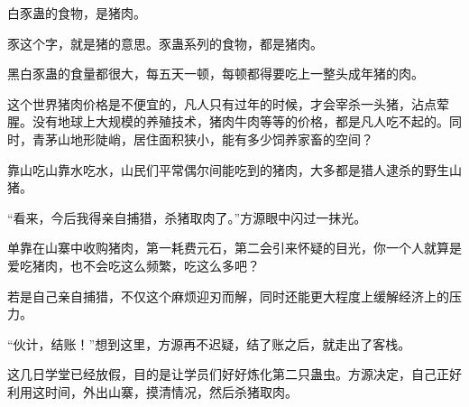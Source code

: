\begin{this_body}
白豕蛊的食物，是猪肉。

豕这个字，就是猪的意思。豕蛊系列的食物，都是猪肉。

黑白豕蛊的食量都很大，每五天一顿，每顿都得要吃上一整头成年猪的肉。

这个世界猪肉价格是不便宜的，凡人只有过年的时候，才会宰杀一头猪，沾点荤腥。没有地球上大规模的养殖技术，猪肉牛肉等等的价格，都是凡人吃不起的。同时，青茅山地形陡峭，居住面积狭小，能有多少饲养家畜的空间？

靠山吃山靠水吃水，山民们平常偶尔间能吃到的猪肉，大多都是猎人逮杀的野生山猪。

“看来，今后我得亲自捕猎，杀猪取肉了。”方源眼中闪过一抹光。

单靠在山寨中收购猪肉，第一耗费元石，第二会引来怀疑的目光，你一个人就算是爱吃猪肉，也不会吃这么频繁，吃这么多吧？

若是自己亲自捕猎，不仅这个麻烦迎刃而解，同时还能更大程度上缓解经济上的压力。

“伙计，结账！”想到这里，方源再不迟疑，结了账之后，就走出了客栈。

这几日学堂已经放假，目的是让学员们好好炼化第二只蛊虫。方源决定，自己正好利用这时间，外出山寨，摸清情况，然后杀猪取肉。

\end{this_body}

